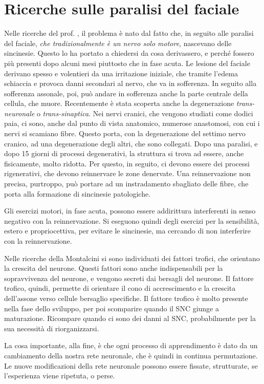\section{Ricerche sulle paralisi del faciale}
Nelle ricerche del prof. \myProf, il problema è nato dal fatto che, in seguito alle paralisi del faciale, \textit{che tradizionalmente
è un nervo solo motore}, nascevano delle sincinesie. Questo lo ha portato a chiedersi da cosa derivassero, e perché fossero più presenti
dopo alcuni mesi piuttosto che in fase acuta. Le lesione del faciale derivano spesso e volentieri da una irritazione iniziale,
che tramite l'edema schiaccia e provoca danni secondari al nervo, che va in sofferenza. In seguito alla sofferenza assonale, poi, può
andare in sofferenza anche la parte centrale della cellula, che muore. Recentemente è stata scoperta anche la degenerazione
\textit{trans-neuronale} o \textit{trans-sinaptica}. Nei nervi cranici, che vengono studiati come dodici paia, ci sono, anche dal punto
di vista anatomico, numerose anastomosi, con cui i nervi si scamiano fibre. Questo porta, con la degenerazione del settimo nervo cranico,
ad una degenerazione degli altri, che sono collegati. Dopo una paralisi, e dopo 15 giorni di processi degenerativi, la struttura si
trova ad essere, anche fisicamente, molto ridotta. Per questo, in seguito, ci devono essere dei processi rigenerativi, che devono
reinnervare le zone denervate. Una reinnervazione non precisa, purtroppo, può portare ad un instradamento sbagliato delle fibre, che
porta alla formazione di sincinesie patologiche.

Gli esercizi motori, in fase acuta, possono essere addirittura interferenti in senso negativo con la reinnervazione. Si eseguono quindi
degli esercizi per la sensibilità, estero e propriocettiva, per evitare le sincinesie, ma cercando di non interferire con la
reinnervazione.

Nelle ricerche della Montalcini si sono individuati dei fattori trofici, che orientano la crescita del neurone. Questi fattori sono
anche indispensabili per la sopravvivenza del neurone, e vengono secreti dai bersagli del neurone. Il fattore trofico, quindi, permette
di orientare il cono di accrescimento e la crescita dell'assone verso cellule bersaglio specifiche. Il fattore trofico è molto presente
nella fase dello sviluppo, per poi scomparire quando il SNC giunge a maturazione. Ricompare quando ci sono dei danni al SNC,
probabilmente per la sua necessità di riorganizzarsi.

La cosa importante, alla fine, è che ogni processo di apprendimento è dato da un cambiamento della nostra rete neuronale, che è quindi
in continua permutazione. Le nuove modificazioni della rete neuronale possono essere fissate, strutturate, se l'esperienza viene
ripetuta, o perse.

